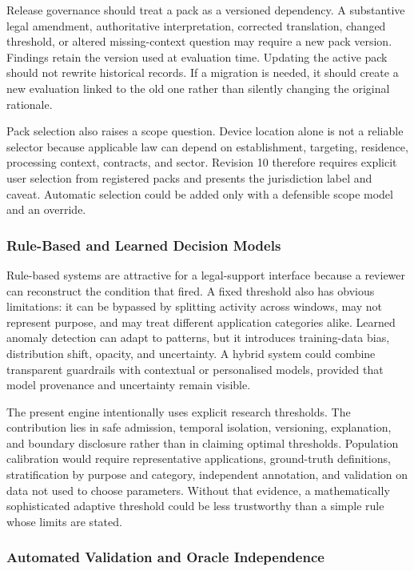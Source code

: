 Release governance should treat a pack as a versioned dependency. A substantive legal amendment, authoritative interpretation, corrected translation, changed threshold, or altered missing-context question may require a new pack version. Findings retain the version used at evaluation time. Updating the active pack should not rewrite historical records. If a migration is needed, it should create a new evaluation linked to the old one rather than silently changing the original rationale.

Pack selection also raises a scope question. Device location alone is not a reliable selector because applicable law can depend on establishment, targeting, residence, processing context, contracts, and sector. Revision 10 therefore requires explicit user selection from registered packs and presents the jurisdiction label and caveat. Automatic selection could be added only with a defensible scope model and an override.

\subsubsection{Rule-Based and Learned Decision Models}

Rule-based systems are attractive for a legal-support interface because a reviewer can reconstruct the condition that fired. A fixed threshold also has obvious limitations: it can be bypassed by splitting activity across windows, may not represent purpose, and may treat different application categories alike. Learned anomaly detection can adapt to patterns, but it introduces training-data bias, distribution shift, opacity, and uncertainty. A hybrid system could combine transparent guardrails with contextual or personalised models, provided that model provenance and uncertainty remain visible.

The present engine intentionally uses explicit research thresholds. The contribution lies in safe admission, temporal isolation, versioning, explanation, and boundary disclosure rather than in claiming optimal thresholds. Population calibration would require representative applications, ground-truth definitions, stratification by purpose and category, independent annotation, and validation on data not used to choose parameters. Without that evidence, a mathematically sophisticated adaptive threshold could be less trustworthy than a simple rule whose limits are stated.

\subsubsection{Automated Validation and Oracle Independence}

